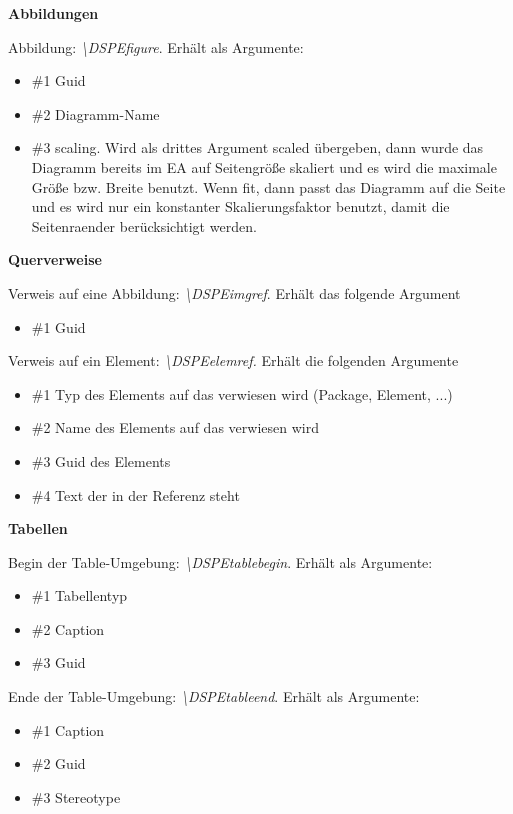 {\textbf{Abbildungen}

Abbildung: \textit{\textbackslash{}DSPEfigure}. Erhält als Argumente:
\begin{itemize}
	\item \#1 Guid
	\item \#2 Diagramm-Name
	\item \#3 scaling. Wird als drittes Argument \dq{}scaled\dq{} übergeben, dann wurde das Diagramm bereits im EA auf Seitengröße skaliert und es wird die maximale Größe bzw. Breite benutzt. Wenn \dq{}fit\dq{}, dann passt das Diagramm auf die Seite und es wird nur ein konstanter Skalierungsfaktor benutzt, damit die Seitenraender berücksichtigt werden.
\end{itemize}

\textbf{Querverweise}

Verweis auf eine Abbildung: \textit{\textbackslash{}DSPEimgref}.  Erhält das folgende Argument
\begin{itemize}
	\item \#1 Guid
\end{itemize}

Verweis auf ein Element: \textit{\textbackslash{}DSPEelemref. }Erhält die folgenden Argumente
\begin{itemize}
	\item \#1 Typ des Elements auf das verwiesen wird (Package, Element, ...)
	\item \#2 Name des Elements auf das verwiesen wird
	\item \#3 Guid des Elements
	\item \#4 Text der in der Referenz steht
\end{itemize}

\textbf{Tabellen}

Begin der Table-Umgebung: \textit{\textbackslash{}DSPEtablebegin}. Erhält als Argumente:
\begin{itemize}
	\item \#1 Tabellentyp
	\item \#2 Caption
	\item \#3 Guid
\end{itemize}

Ende der Table-Umgebung: \textit{\textbackslash{}DSPEtableend}. Erhält als Argumente:
\begin{itemize}
	\item \#1 Caption
	\item \#2 Guid
	\item \#3 Stereotype
\end{itemize}

}
